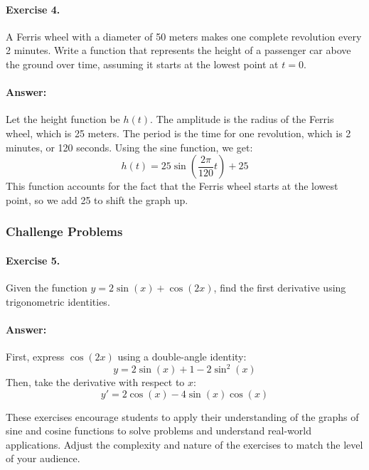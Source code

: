 \documentclass[a4paper,12pt]{book}
\newcounter{problem}
\begin{document}
\paragraph{Exercise 4.} A Ferris wheel with a diameter of 50 meters makes one complete revolution every 2 minutes. Write a function that represents the height of a passenger car above the ground over time, assuming it starts at the lowest point at \( t=0 \).

\paragraph{Answer:} Let the height function be \( h(t) \). The amplitude is the radius of the Ferris wheel, which is 25 meters. The period is the time for one revolution, which is 2 minutes, or 120 seconds. Using the sine function, we get:
\[ h(t) = 25\sin\left(\frac{2\pi}{120}t\right) + 25 \]
This function accounts for the fact that the Ferris wheel starts at the lowest point, so we add 25 to shift the graph up.

\subsubsection*{Challenge Problems}

\paragraph{Exercise 5.} Given the function \( y = 2\sin(x) + \cos(2x) \), find the first derivative using trigonometric identities.

\paragraph{Answer:} First, express \( \cos(2x) \) using a double-angle identity:
\[ y = 2\sin(x) + 1 - 2\sin^2(x) \]
Then, take the derivative with respect to \( x \):
\[ y' = 2\cos(x) - 4\sin(x)\cos(x) \]

These exercises encourage students to apply their understanding of the graphs of sine and cosine functions to solve problems and understand real-world applications. Adjust the complexity and nature of the exercises to match the level of your audience.

\end{document}
